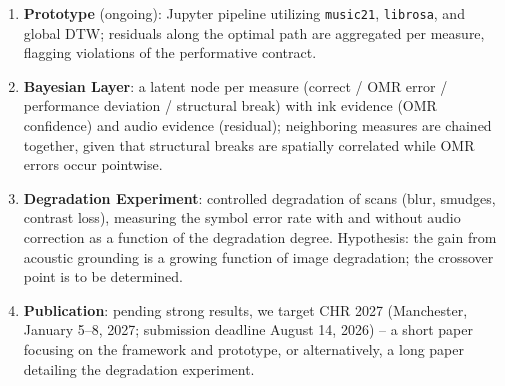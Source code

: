 \documentclass[11pt,a4paper]{article}
\begin{document}
\begin{enumerate}
  \item \textbf{Prototype} (ongoing): Jupyter pipeline utilizing \texttt{music21}, \texttt{librosa}, and global DTW; residuals along the optimal path are aggregated per measure, flagging violations of the performative contract.
  \item \textbf{Bayesian Layer}: a latent node per measure (correct / OMR error / performance deviation / structural break) with ink evidence (OMR confidence) and audio evidence (residual); neighboring measures are chained together, given that structural breaks are spatially correlated while OMR errors occur pointwise.
  \item \textbf{Degradation Experiment}: controlled degradation of scans (blur, smudges, contrast loss), measuring the symbol error rate with and without audio correction as a function of the degradation degree. Hypothesis: the gain from acoustic grounding is a growing function of image degradation; the crossover point is to be determined.
  \item \textbf{Publication}: pending strong results, we target CHR 2027 (Manchester, January 5--8, 2027; submission deadline August 14, 2026) -- a short paper focusing on the framework and prototype, or alternatively, a long paper detailing the degradation experiment.
\end{enumerate}



\end{document}
